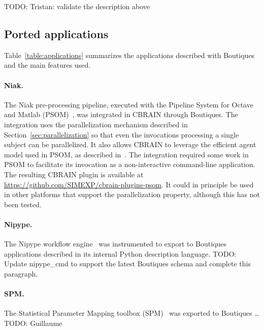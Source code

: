 \documentclass{article}
\newcommand{\todo}[1]{\color{red}TODO: #1\color{black}}
\begin{document}
\todo{Tristan: validate the description above}

\subsection{Ported applications}


Table~\ref{table:applications} summarizes the applications described
with Boutiques and the main features used.

\paragraph{Niak.} The Niak pre-processing pipeline, executed with the Pipeline System
for Octave and Matlab (PSOM)~\cite{bellec2012pipeline}, was integrated
in CBRAIN through Boutiques. The integration uses the parallelization
mechanism described in Section~\ref{sec:parallelization} so that even
the invocations processing a single subject can be parallelized. It also
allows CBRAIN to leverage the efficient agent model used in PSOM, as
described in~\cite{GLAT-16}. The integration required some work in
PSOM to facilitate its invocation as a non-interactive command-line
application. The resulting CBRAIN plugin is available at
\url{https://github.com/SIMEXP/cbrain-plugins-psom}. It could in
principle be used in other platforms that support the parallelization
property, although this has not been tested.

\paragraph{Nipype.} The Nipype workflow engine~\cite{gorgolewski2011nipype} was
instrumented to export to Boutiques applications described in its
internal Python description language. \todo{Update nipype\_cmd to
  support the latest Boutiques schema and complete this paragraph.}

\paragraph{SPM.} The Statistical Parameter Mapping toolbox (SPM)~\cite{penny2011statistical}
was exported to Boutiques \ldots \todo{Guillaume}
\end{document}
